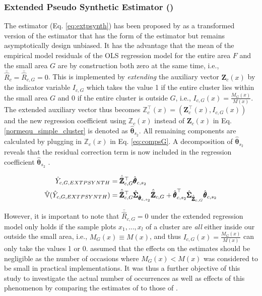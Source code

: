 \subsubsection{Extended Pseudo Synthetic Estimator (\extpsynth{})}
\label{sec:extpsynth}

The \extpsynth{} estimator (Eq. \ref{eq:extpsynth}) has been proposed by \citet{mandallaz2013a} as a transformed version of the \psmall{} estimator that has the form of the \psynth{} estimator but remains asymptotically design unbiased. It has the advantage that the mean of the empirical model residuals of the OLS regression model for the entire area $F$ and the small area $G$ are by construction both zero at the same time, i.e., $\bar{\hat{R}}_{c} = \bar{\hat{R}}_{c,G} = 0$. This is implemented by \textit{extending} the auxiliary vector $\pmb{Z}_{c}(x)$ by the indicator variable $I_{c,G}$ which takes the value 1 if the entire cluster lies within the small area $G$ and 0 if the entire cluster is outside $G$, i.e., $I_{c,G}(x)=\frac{M_{G}(x)}{M(x)}$. The extended auxiliary vector thus becomes $\pmb{\mathbb{Z}}_{c}^{\top}(x)= (\pmb{Z}_{c}^{\top}(x),I_{c,G}(x))$ and the new regression coefficient using $\pmb{\mathbb{Z}}_{c}(x)$ instead of $\pmb{Z}_{c}(x)$ in Eq. \ref{normequ_simple_cluster} is denoted as $\hat{\pmb{\theta}}_{s_2}$. All remaining components are calculated by plugging in $\pmb{\mathbb{Z}}_{c}(x)$ in Eq. \ref{eq:compsG}. A decomposition of $\hat{\pmb{\theta}}_{s_2}$ reveals that the residual correction term is now included in the regression coefficient $\hat{\pmb{\theta}}_{s_2}$ \citep{mandallaz2016}.

\begin{subequations}\label{eq:extpsynth}
	\begin{align}
	\hat{Y}_{c,G,EXTPSYNTH} & =\hat{\bar{\pmb{\mathbb{Z}}}}_{c,G}^{\top}\hat{\pmb{\theta}}_{c,s_2} \label{eq:extpsynth_pest} \\
	\hat{\mathbb{V}}(\hat{Y}_{c,G,EXTPSYNTH})& =
	\hat{\bar{\pmb{\mathbb{Z}}}}_{c,G}^{\top}\hat{\pmb{\Sigma}}_{\hat{\pmb{\theta}}_{c,s_2}}
	\hat{\bar{\pmb{\mathbb{Z}}}}_{c,G}
	+ \hat{\pmb{\theta}}^{\top}_{c,s_2}\hat{\pmb{\Sigma}}_{\hat{\bar{\pmb{\mathbb{Z}}}}_{c,G}}\hat{\pmb{\theta}}_{c,s_2} \label{eq:extpsynth_var}
	\end{align}
\end{subequations}

However, it is important to note that $\bar{\hat{R}}_{c,G} = 0$ under the extended regression model only holds if the sample plots $x_1, ..., x_l$ of a cluster are \textit{all} either inside our outside the small area, i.e., $M_G(x)\equiv M(x)$, and thus $I_{c,G}(x)=\frac{M_{G}(x)}{M(x)}$ can only take the values 1 or 0. \citet{mandallaz2016} assumed that the effects on the estimates should be negligible as the number of occasions where $M_{G}(x) < M(x)$ was considered to be small in practical implementations. It was thus a further objective of this study to investigate the actual number of occurrences as well as effects of this phenomenon by comparing the estimates of \extpsynth{} to those of \psmall{}. %


